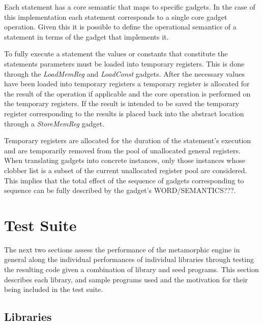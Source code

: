 \documentclass[finalcopy,short]{srpaper}
\begin{document}
            Each statement has a core semantic that maps to specific gadgets. In
            the case of this implementation each statement corresponds to a
            single core gadget operation. Given this it is possible to define
            the operational semantics of a statement in terms of the gadget that
            implements it.

            To fully execute a statement the values or constants that constitute
            the statements parameters must be loaded into temporary registers.
            This is done through the \emph{LoadMemReg} and \emph{LoadConst}
            gadgets. After the necessary values have been loaded into temporary
            registers a temporary register is allocated for the result of the
            operation if applicable and the core operation is performed on the
            temporary registers. If the result is intended to be saved the
            temporary register corresponding to the results is placed back into
            the abstract location through a \emph{StoreMemReg} gadget.
            
            Temporary registers are allocated for the duration of the
            statement's execution and are temporarily removed from the pool of
            unallocated general registers. When translating gadgets into
            concrete instances, only those instances whose clobber list is a
            subset of the current unallocated register pool are considered. This
            implies that the total effect of the sequence of gadgets
            corresponding to sequence can be fully described by the gadget's
            WORD/SEMANTICS???.
        
    \section{Test Suite}
        
        The next two sections assess the performance of the metamorphic engine
        in general along the individual performances of individual libraries
        through testing the resulting code given a combination of library and
        seed programs. This section describes each library, and sample programs
        used and the motivation for their being included in the test suite.

        \subsection{Libraries}
\end{document}
